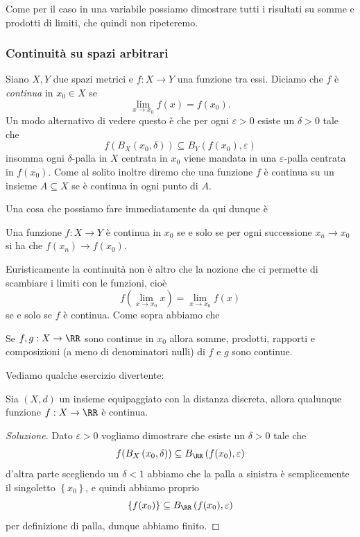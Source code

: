 \documentclass[11pt]{scrartcl}
\begin{document}
	Come per il caso in una variabile possiamo dimostrare tutti i risultati su somme e prodotti di limiti, che quindi non ripeteremo.
	
	\subsubsection{Continuità su spazi arbitrari}
	
	\begin{definition}[Continuità]
		Siano $X,Y$ due spazi metrici e $f:X\to Y$ una funzione tra essi. Diciamo che $f$ è \textit{continua} in $x_0\in X$ se 
		$$\lim_{x\to x_0}f(x)=f(x_0).$$
		Un modo alternativo di vedere questo è che per ogni $\varepsilon>0$ esiste un $\delta>0$ tale che
		$$f\left(B_X\left(x_0,\delta\right)\right)\subseteq B_Y\left(f(x_0),\varepsilon\right)$$
		insomma ogni $\delta$-palla in $X$ centrata in $x_0$ viene mandata in una $\varepsilon$-palla centrata in $f(x_0)$. Come al solito inoltre diremo che una funzione $f$ è continua su un insieme $A\subseteq X$ se è continua in ogni punto di $A$.
	\end{definition}
	Una cosa che possiamo fare immediatamente da qui dunque è
	\begin{proposition}
		Una funzione $f:X\to Y$ è continua in $x_0$ se e solo se per ogni successione $x_n\to x_0$ si ha che $f(x_n)\to f(x_0)$.
	\end{proposition}
	Euristicamente la continuità non è altro che la nozione che ci permette di scambiare i limiti con le funzioni, cioè
	$$f\left(\lim_{x\to x_0}x\right)=\lim_{x\to x_0}f(x)$$
	se e solo se $f$ è continua. Come sopra abbiamo che
	\begin{proposition}
		Se $f,g:X\to \RR$ sono continue in $x_0$ allora somme, prodotti, rapporti e composizioni (a meno di denominatori nulli) di $f$ e $g$ sono continue.
	\end{proposition}
	Vediamo qualche esercizio divertente:
	\begin{problem}
		Sia $(X,d)$ un insieme equipaggiato con la distanza discreta, allora qualunque funzione $f:X\to \RR$ è continua.
	\end{problem}
	\begin{proof}[Soluzione]
		Dato $\varepsilon>0$ vogliamo dimostrare che esiste un $\delta>0$ tale che
		$$f(B_X\left(x_0,\delta\right))\subseteq B_\RR\left(f(x_0),\varepsilon\right)$$
		d'altra parte scegliendo un $\delta<1$ abbiamo che la palla a sinistra è semplicemente il singoletto $\left\{x_0\right\}$, e quindi abbiamo proprio
		$$\left\{f(x_0)\right\}\subseteq B_\RR\left(f(x_0),\varepsilon\right)$$
		per definizione di palla, dunque abbiamo finito.
	\end{proof}
\end{document}
